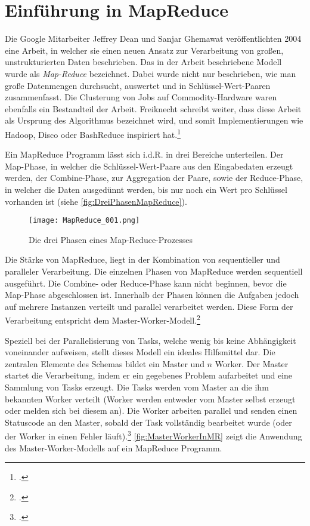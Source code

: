 \section{Einführung in MapReduce}\label{sec:EinführungInMapReduce}
Die Google Mitarbeiter Jeffrey Dean und Sanjar Ghemawat veröffentlichten 2004 eine Arbeit, in welcher sie einen neuen Ansatz zur Verarbeitung von großen, unstrukturierten Daten beschrieben. Das in der Arbeit beschriebene Modell wurde als \textit{Map-Reduce} bezeichnet. Dabei wurde nicht nur beschrieben, wie man große Datenmengen durchsucht, auswertet und in Schlüssel-Wert-Paaren zusammenfasst. Die Clusterung von Jobs auf \gls{Commodity-Hardware} waren ebenfalls ein Bestandteil der Arbeit. Freiknecht schreibt weiter, dass diese Arbeit als Ursprung des Algorithmus bezeichnet wird, und somit Implementierungen wie Hadoop, Disco oder BashReduce inspiriert hat.\footcite[Vgl.][S. 42]{Freiknecht.2014}

Ein MapReduce Programm lässt sich i.d.R. in drei Bereiche unterteilen. Der Map-Phase, in welcher die Schlüssel-Wert-Paare aus den Eingabedaten erzeugt werden, der Combine-Phase, zur Aggregation der Paare, sowie der Reduce-Phase, in welcher die Daten ausgedünnt werden, bis nur noch ein Wert pro Schlüssel vorhanden ist (siehe \autoref{fig:DreiPhasenMapReduce}).

\begin{figure}[h]
	\centering
	\texttt{[image: MapReduce\_001.png]}
	\caption{Die drei Phasen eines Map-Reduce-Prozesses\footnotemark}
	\label{fig:DreiPhasenMapReduce}
\end{figure}

Die Stärke von MapReduce, liegt in der Kombination von sequentieller und paralleler Verarbeitung. Die einzelnen Phasen von MapReduce werden sequentiell ausgeführt. Die Combine- oder Reduce-Phase kann nicht beginnen, bevor die Map-Phase abgeschlossen ist. Innerhalb der Phasen können die Aufgaben jedoch auf mehrere Instanzen verteilt und parallel verarbeitet werden. Diese Form der Verarbeitung entspricht dem Master-Worker-Modell.\footcite[Vgl.][S.1 f]{Karloff.2010}

Speziell bei der Parallelisierung von Tasks, welche wenig bis keine Abhängigkeit voneinander aufweisen, stellt dieses Modell ein ideales Hilfsmittel dar. Die zentralen Elemente des Schemas bildet ein Master und $n$ Worker. Der Master startet die Verarbeitung, indem er ein gegebenes Problem aufarbeitet und eine Sammlung von Tasks erzeugt.  Die Tasks werden vom Master an die ihm bekannten Worker verteilt (Worker werden entweder vom Master selbst erzeugt oder melden sich bei diesem an). Die Worker arbeiten parallel und senden einen Statuscode an den Master, sobald der Task vollständig bearbeitet wurde (oder der Worker in einen Fehler läuft).\footcite[Vgl.][S. 80 ff]{Fey.2008} \autoref{fig:MasterWorkerInMR} zeigt die Anwendung des Master-Worker-Modells auf ein MapReduce Programm.

